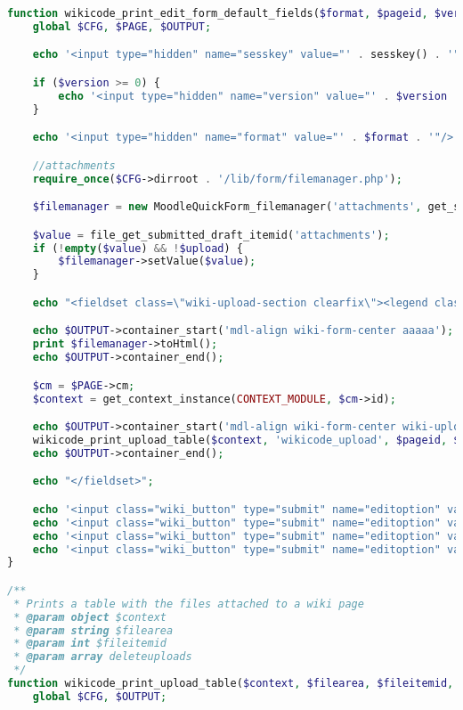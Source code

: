 \begin{lstlisting}[language=PHP]
function wikicode_print_edit_form_default_fields($format, $pageid, $version = -1, $upload = false, $deleteuploads = array()) {
    global $CFG, $PAGE, $OUTPUT;

    echo '<input type="hidden" name="sesskey" value="' . sesskey() . '" />';

    if ($version >= 0) {
        echo '<input type="hidden" name="version" value="' . $version . '" />';
    }

    echo '<input type="hidden" name="format" value="' . $format . '"/>';

    //attachments
    require_once($CFG->dirroot . '/lib/form/filemanager.php');

    $filemanager = new MoodleQuickForm_filemanager('attachments', get_string('wikiattachments', 'wikicode'), array('id' => 'attachments'), array('subdirs' => false, 'maxfiles' => 99, 'maxbytes' => $CFG->maxbytes));

    $value = file_get_submitted_draft_itemid('attachments');
    if (!empty($value) && !$upload) {
        $filemanager->setValue($value);
    }

    echo "<fieldset class=\"wiki-upload-section clearfix\"><legend class=\"ftoggler\">" . get_string("uploadtitle", 'wikicode') . "</legend>";

    echo $OUTPUT->container_start('mdl-align wiki-form-center aaaaa');
    print $filemanager->toHtml();
    echo $OUTPUT->container_end();

    $cm = $PAGE->cm;
    $context = get_context_instance(CONTEXT_MODULE, $cm->id);

    echo $OUTPUT->container_start('mdl-align wiki-form-center wiki-upload-table');
    wikicode_print_upload_table($context, 'wikicode_upload', $pageid, $deleteuploads);
    echo $OUTPUT->container_end();

    echo "</fieldset>";

    echo '<input class="wiki_button" type="submit" name="editoption" value="' . get_string('save', 'wikicode') . '"/>';
    echo '<input class="wiki_button" type="submit" name="editoption" value="' . get_string('upload', 'wikicode') . '"/>';
    echo '<input class="wiki_button" type="submit" name="editoption" value="' . get_string('preview') . '"/>';
    echo '<input class="wiki_button" type="submit" name="editoption" value="' . get_string('cancel') . '" />';
}

/**
 * Prints a table with the files attached to a wiki page
 * @param object $context
 * @param string $filearea
 * @param int $fileitemid
 * @param array deleteuploads
 */
function wikicode_print_upload_table($context, $filearea, $fileitemid, $deleteuploads = array()) {
    global $CFG, $OUTPUT;


\end{lstlisting}
